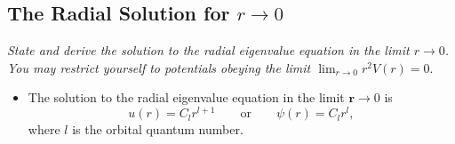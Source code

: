 \documentclass[11pt, a4paper]{article}
\renewcommand{\vec}[1]{\bm{#1}}  %
\renewcommand{\r}{\vec{r}}  %
\begin{document}
\subsection{The Radial Solution for $ r \to 0 $}
\textit{State and derive the solution to the radial eigenvalue equation in the limit $ r \to 0 $. You may restrict yourself to potentials obeying the limit $ \lim_{r \to 0} r^{2}V(r) = 0. $}

\begin{itemize}
    \item The solution to the radial eigenvalue equation in the limit $ \r \to 0 $ is
    \begin{equation*}
        u(r) = C_{l}r^{l+1} \qquad \text{or} \qquad \psi(r) = C_{l}r^{l},
    \end{equation*}
    where $ l $ is the orbital quantum number.
    
\end{itemize}
\end{document}
